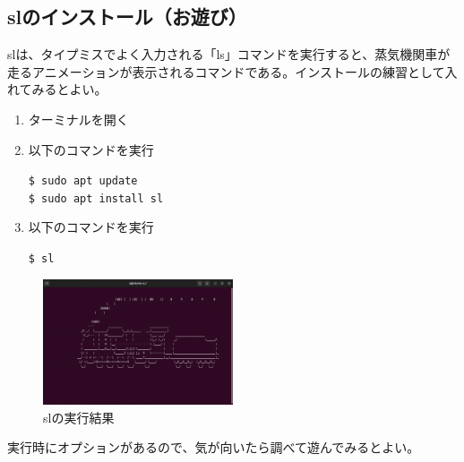 \documentclass[a4paper, 11pt, dvipdfmx]{jsarticle}
\begin{document}
\subsection{slのインストール（お遊び）} 
  slは、タイプミスでよく入力される「ls」コマンドを実行すると、蒸気機関車が走るアニメーションが表示されるコマンドである。インストールの練習として入れてみるとよい。
  \begin{enumerate}
    \item ターミナルを開く
    \item 以下のコマンドを実行
    \begin{terminalbox}
      \verb|$ sudo apt update|\\
      \verb|$ sudo apt install sl|
    \end{terminalbox}
    \item 以下のコマンドを実行
    \begin{terminalbox}
      \verb|$ sl|
    \end{terminalbox}
  \end{enumerate}
  \begin{figure}[H]
    \centering
    \includegraphics[width=0.5\textwidth]{images/linux-server/3_4-sl.png}
    \caption{slの実行結果}
    \label{fig:sl}
  \end{figure}
  実行時にオプションがあるので、気が向いたら調べて遊んでみるとよい。
\end{document}
